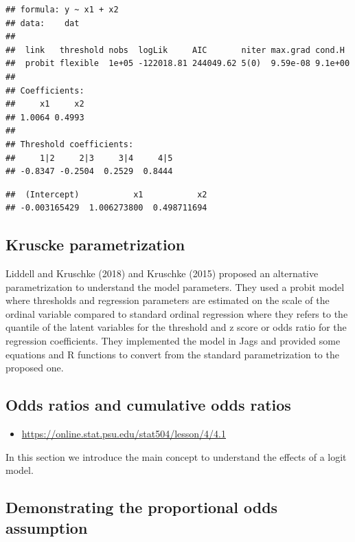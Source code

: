 \documentclass[
  man,floatsintext]{apa6}
\providecommand{\tightlist}{%
  \setlength{\itemsep}{0pt}\setlength{\parskip}{0pt}}
\begin{document}
\begin{verbatim}
## formula: y ~ x1 + x2
## data:    dat
## 
##  link   threshold nobs  logLik     AIC       niter max.grad cond.H 
##  probit flexible  1e+05 -122018.81 244049.62 5(0)  9.59e-08 9.1e+00
## 
## Coefficients:
##     x1     x2 
## 1.0064 0.4993 
## 
## Threshold coefficients:
##     1|2     2|3     3|4     4|5 
## -0.8347 -0.2504  0.2529  0.8444
\end{verbatim}

\begin{verbatim}
##  (Intercept)           x1           x2 
## -0.003165429  1.006273800  0.498711694
\end{verbatim}

\subsection{Kruscke parametrization}\label{kruscke-parametrization}

Liddell and Kruschke (2018) and Kruschke (2015) proposed an alternative parametrization to understand the model parameters. They used a probit model where thresholds and regression parameters are estimated on the scale of the ordinal variable compared to standard ordinal regression where they refers to the quantile of the latent variables for the threshold and z score or odds ratio for the regression coefficients. They implemented the model in Jags and provided some equations and R functions to convert from the standard parametrization to the proposed one.

\subsection{Odds ratios and cumulative odds ratios}\label{odds-ratios-and-cumulative-odds-ratios}

\begin{itemize}
\tightlist
\item
  \url{https://online.stat.psu.edu/stat504/lesson/4/4.1}
\end{itemize}

In this section we introduce the main concept to understand the effects of a logit model.

\subsection{Demonstrating the proportional odds assumption}\label{demonstrating-the-proportional-odds-assumption}
\end{document}
